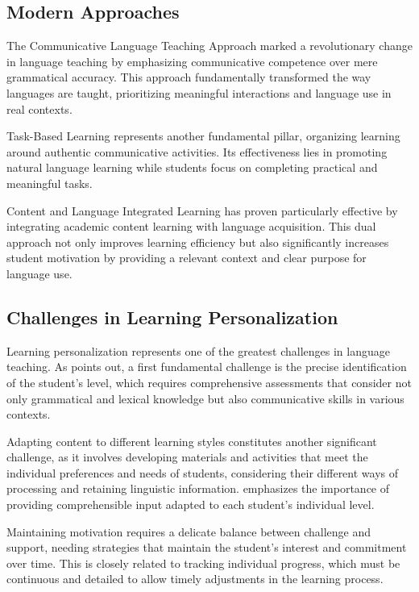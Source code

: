 \subsection{Modern Approaches}

The Communicative Language Teaching Approach \cite{hymes1972communicative} marked a revolutionary change in language teaching by emphasizing communicative competence over mere grammatical accuracy. This approach fundamentally transformed the way languages are taught, prioritizing meaningful interactions and language use in real contexts.

Task-Based Learning \cite{nunan1989designing} represents another fundamental pillar, organizing learning around authentic communicative activities. Its effectiveness lies in promoting natural language learning while students focus on completing practical and meaningful tasks.

Content and Language Integrated Learning \cite{coyle2010clil} has proven particularly effective by integrating academic content learning with language acquisition. This dual approach not only improves learning efficiency but also significantly increases student motivation by providing a relevant context and clear purpose for language use.

\subsection{Challenges in Learning Personalization}

Learning personalization represents one of the greatest challenges in language teaching. As \cite{ellis1994study} points out, a first fundamental challenge is the precise identification of the student's level, which requires comprehensive assessments that consider not only grammatical and lexical knowledge but also communicative skills in various contexts.

Adapting content to different learning styles constitutes another significant challenge, as it involves developing materials and activities that meet the individual preferences and needs of students, considering their different ways of processing and retaining linguistic information. \cite{krashen1982principles} emphasizes the importance of providing comprehensible input adapted to each student's individual level.

Maintaining motivation requires a delicate balance between challenge and support, needing strategies that maintain the student's interest and commitment over time. This is closely related to tracking individual progress, which must be continuous and detailed to allow timely adjustments in the learning process.

